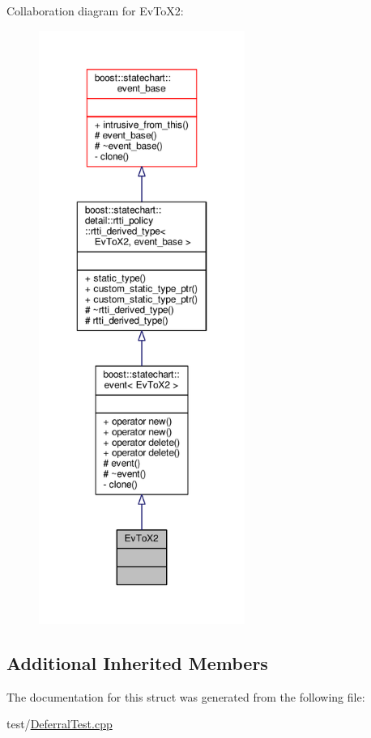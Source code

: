 Collaboration diagram for Ev\+To\+X2\+:
\nopagebreak
\begin{figure}[H]
\begin{center}
\leavevmode
\includegraphics[height=550pt]{struct_ev_to_x2__coll__graph}
\end{center}
\end{figure}
\subsection*{Additional Inherited Members}


The documentation for this struct was generated from the following file\+:\begin{DoxyCompactItemize}
\item 
test/\mbox{\hyperlink{_deferral_test_8cpp}{Deferral\+Test.\+cpp}}\end{DoxyCompactItemize}
